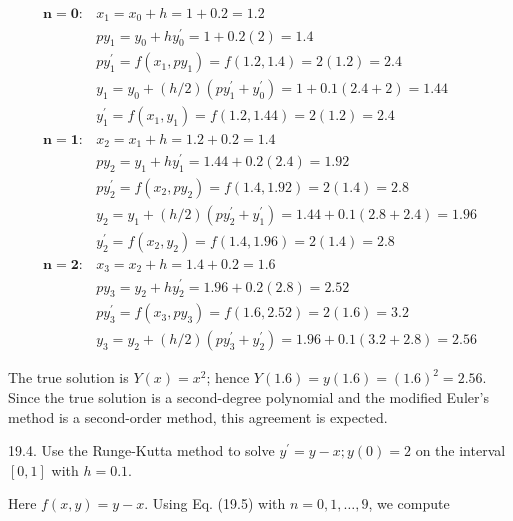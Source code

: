 \documentclass[10pt]{article}
\begin{document}
$$
\begin{array}{ll}
\mathbf{n = 0}: & x_{1}=x_{0}+h=1+0.2=1.2 \\
& p y_{1}=y_{0}+h y_{0}^{\prime}=1+0.2(2)=1.4 \\
& p y_{1}^{\prime}=f\left(x_{1}, p y_{1}\right)=f(1.2,1.4)=2(1.2)=2.4 \\
& y_{1}=y_{0}+(h / 2)\left(p y_{1}^{\prime}+y_{0}^{\prime}\right)=1+0.1(2.4+2)=1.44 \\
& y_{1}^{\prime}=f\left(x_{1}, y_{1}\right)=f(1.2,1.44)=2(1.2)=2.4 \\
\mathbf{n = 1}: & x_{2}=x_{1}+h=1.2+0.2=1.4 \\
& p y_{2}=y_{1}+h y_{1}^{\prime}=1.44+0.2(2.4)=1.92 \\
& p y_{2}^{\prime}=f\left(x_{2}, p y_{2}\right)=f(1.4,1.92)=2(1.4)=2.8 \\
& y_{2}=y_{1}+(h / 2)\left(p y_{2}^{\prime}+y_{1}^{\prime}\right)=1.44+0.1(2.8+2.4)=1.96 \\
& y_{2}^{\prime}=f\left(x_{2}, y_{2}\right)=f(1.4,1.96)=2(1.4)=2.8 \\
\mathbf{n = 2}: & x_{3}=x_{2}+h=1.4+0.2=1.6 \\
& p y_{3}=y_{2}+h y_{2}^{\prime}=1.96+0.2(2.8)=2.52 \\
& p y_{3}^{\prime}=f\left(x_{3}, p y_{3}\right)=f(1.6,2.52)=2(1.6)=3.2 \\
& y_{3}=y_{2}+(h / 2)\left(p y_{3}^{\prime}+y_{2}^{\prime}\right)=1.96+0.1(3.2+2.8)=2.56
\end{array}
$$

The true solution is $Y(x)=x^{2}$; hence $Y(1.6)=y(1.6)=(1.6)^{2}=2.56$. Since the true solution is a second-degree polynomial and the modified Euler's method is a second-order method, this agreement is expected.

19.4. Use the Runge-Kutta method to solve $y^{\prime}=y-x ; y(0)=2$ on the interval $[0,1]$ with $h=0.1$.

Here $f(x, y)=y-x$. Using Eq. (19.5) with $n=0,1, \ldots, 9$, we compute
\end{document}
